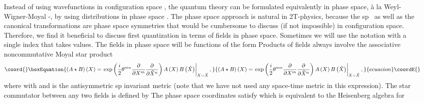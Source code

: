 \documentclass[a4paper,12pt]{article}
\begin{document}
Instead of using wavefunctions in configuration space \coordHE{}, the quantum theory can be formulated equivalently in
phase space, \`{a} la Weyl-Wigner-Moyal \cite{weyl}-\cite{moyal}, by using
distributions in phase space \coordHE{}. The
phase space approach is natural in 2T-physics, because the sp\coordHE{} \ as well as the canonical transformations \coordHE{} are phase space symmetries that would be cumbersome to
discuss (if not impossible) in configuration space. Therefore, we find it
beneficial to discuss first quantization in terms of fields in phase space.
Sometimes we will use the notation \coordHE{} with a single index \coordHE{} that takes \coordHE{}
values. The fields in phase space will be functions of the form \coordHE{} Products of fields \coordHE{} always involve the associative
noncommutative Moyal star product 
\begin{equation}\coord{}\boxEquation{
\left( A\star B\right) \left( X\right) =\left. \exp \left( \frac{i}{2}\theta
^{mn}\frac{\partial }{\partial X^{m}}\frac{\partial }{\partial \tilde{X}^{n}}
\right) A\left( X\right) B\left( \tilde{X}\right) \right| _{X=\tilde{X}},
}{
\left( A\star B\right) \left( X\right) =\left. \exp \left( \frac{i}{2}\theta
^{mn}\frac{\partial }{\partial X^{m}}\frac{\partial }{\partial \tilde{X}^{n}}
\right) A\left( X\right) B\left( \tilde{X}\right) \right| _{X=\tilde{X}},
}{ecuacion}\coordE{}\end{equation}
where \coordHE{} with \coordHE{} and \coordHE{} is the antisymmetric sp\coordHE{}
invariant metric (note that we have not used any space-time metric in this
expression). The star commutator between any two fields is defined by \coordHE{} The phase space coordinates
satisfy \coordHE{} which is
equivalent to the Heisenberg algebra for \coordHE{}
\end{document}
